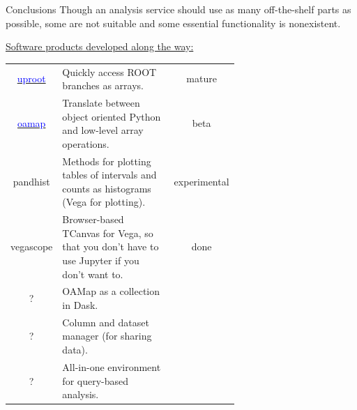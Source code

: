 \documentclass[aspectratio=169]{beamer}
\begin{document}
\begin{frame}{Conclusions}
\vspace{0.35 cm}
Though an analysis service should use as many off-the-shelf parts as possible, some are not suitable and some essential functionality is nonexistent.

\vspace{0.25 cm}
\underline{Software products developed along the way:}

\renewcommand{\arraystretch}{1.2}

\vspace{0.25 cm}
\begin{tabular}{c p{0.65\linewidth} c}
\href{https://github.com/scikit-hep/uproot}{\textcolor{blue}{uproot}} & Quickly access ROOT branches as arrays. & mature \\
\href{https://github.com/diana-hep/oamap}{\textcolor{blue}{oamap}} & Translate between object oriented Python and low-level array operations. & beta \\
pandhist & Methods for plotting tables of intervals and counts as histograms (Vega for plotting). & experimental \\
vegascope & Browser-based TCanvas for Vega, so that you don't have to use Jupyter if you don't want to. & done \\
? & OAMap as a collection in Dask. & \\
? & Column and dataset manager (for sharing data). & \\
? & All-in-one environment for query-based analysis. & \\
\end{tabular}
\end{frame}
\end{document}
